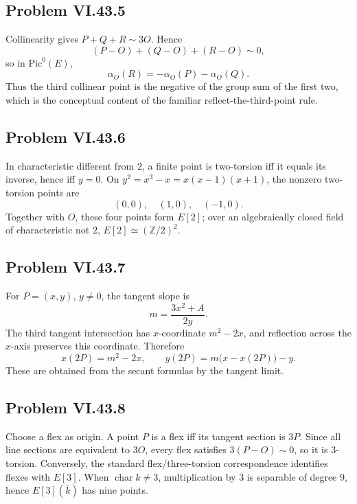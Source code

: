 \subsection*{Problem VI.43.5}
\begin{solution}
Collinearity gives \(P+Q+R\sim3O\).  Hence
\[
(P-O)+(Q-O)+(R-O)\sim0,
\]
so in \(\mathrm{Pic}^0(E)\),
\[
\alpha_O(R)=-\alpha_O(P)-\alpha_O(Q).
\]
Thus the third collinear point is the negative of the group sum of the first two, which is the conceptual content of the familiar reflect-the-third-point rule.
\end{solution}

\subsection*{Problem VI.43.6}
\begin{solution}
In characteristic different from \(2\), a finite point is two-torsion iff it equals its inverse, hence iff \(y=0\).  On \(y^2=x^3-x=x(x-1)(x+1)\), the nonzero two-torsion points are
\[
(0,0),\quad(1,0),\quad(-1,0).
\]
Together with \(O\), these four points form \(E[2]\); over an algebraically closed field of characteristic not \(2\), \(E[2]\simeq(\mathbb Z/2)^2\).
\end{solution}

\subsection*{Problem VI.43.7}
\begin{solution}
For \(P=(x,y)\), \(y\neq0\), the tangent slope is
\[
m=\frac{3x^2+A}{2y}.
\]
The third tangent intersection has \(x\)-coordinate \(m^2-2x\), and reflection across the \(x\)-axis preserves this coordinate.  Therefore
\[
x(2P)=m^2-2x,\qquad
y(2P)=m\bigl(x-x(2P)\bigr)-y.
\]
These are obtained from the secant formulas by the tangent limit.
\end{solution}

\subsection*{Problem VI.43.8}
\begin{solution}
Choose a flex as origin.  A point \(P\) is a flex iff its tangent section is \(3P\).  Since all line sections are equivalent to \(3O\), every flex satisfies \(3(P-O)\sim0\), so it is \(3\)-torsion.  Conversely, the standard flex/three-torsion correspondence identifies flexes with \(E[3]\).  When \(\operatorname{char}k\neq3\), multiplication by \(3\) is separable of degree \(9\), hence \(E[3](\bar k)\) has nine points.
\end{solution}

